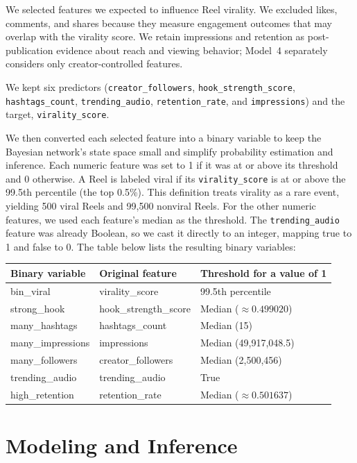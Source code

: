 \documentclass{article}
\begin{document}
We selected features we expected to influence Reel virality. We excluded likes,
comments, and shares because they measure engagement outcomes that may overlap
with the virality score. We retain impressions and retention as post-publication
evidence about reach and viewing behavior; Model~4 separately considers only
creator-controlled features.

{\raggedright
We kept six predictors (\texttt{creator\_followers},
\texttt{hook\_strength\_score}, \texttt{hashtags\_count},
\texttt{trending\_audio}, \texttt{retention\_rate}, and
\texttt{impressions}) and the target, \texttt{virality\_score}.
\par}

We then converted each selected feature into a binary variable to keep the
Bayesian network's state space small and simplify probability estimation and
inference. Each numeric feature was set to 1 if it was at or above its threshold
and 0 otherwise. A Reel is labeled viral if its \texttt{virality\_score} is at or
above the 99.5th percentile (the top 0.5\%). This definition treats virality as a
rare event, yielding 500 viral Reels and 99,500 nonviral Reels. For the other
numeric features, we used each feature's median as the threshold. The \texttt{trending\_audio}
feature was already Boolean, so we cast it directly to an integer, mapping true
to 1 and false to 0. The table below lists the resulting binary variables:

\begin{center}
\begin{tabular}{lll}
\toprule
Binary variable & Original feature & Threshold for a value of 1 \\
\midrule
bin\_viral & virality\_score & 99.5th percentile \\
strong\_hook & hook\_strength\_score & Median ($\approx 0.499020$) \\
many\_hashtags & hashtags\_count & Median (15) \\
many\_impressions & impressions & Median (49,917,048.5) \\
many\_followers & creator\_followers & Median (2,500,456) \\
trending\_audio & trending\_audio & True \\
high\_retention & retention\_rate & Median ($\approx 0.501637$) \\
\bottomrule
\end{tabular}
\end{center}

\section{Modeling and Inference}
\end{document}
